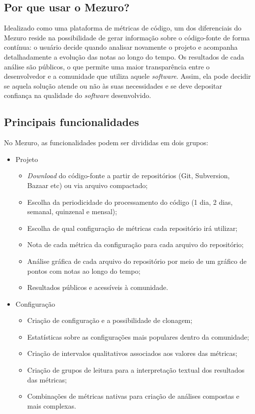 \documentclass{llncs}
\begin{document}
  \subsection{Por que usar o Mezuro?} \label{sec:projeto-mezuro}
  Idealizado como uma plataforma de métricas de código, um dos diferenciais do Mezuro reside na possibilidade de gerar informação sobre o código-fonte de forma contínua: o usuário decide quando analisar novamente o projeto e acompanha detalhadamente a evolução das notas ao longo do tempo. Os resultados de cada análise são públicos, o que permite uma maior transparência entre o desenvolvedor e a comunidade que utiliza aquele \textit{software}. Assim, ela pode decidir se aquela solução atende ou não às suas necessidades e se deve depositar confiança na qualidade do \textit{software} desenvolvido.

  \subsection{Principais funcionalidades}\label{sec:princ-funcionalidades}
  No Mezuro, as funcionalidades podem ser divididas em dois grupos:
  \begin{itemize}
    \item Projeto
      \begin{itemize}
      \item \textit{Download} do código-fonte a partir de repositórios (Git, Subversion, Bazaar etc) ou via arquivo compactado;
          \item Escolha da periodicidade do processamento do código (1 dia, 2 dias, semanal, quinzenal e mensal);
          \item Escolha de qual configuração de métricas cada repositório irá utilizar;
          \item Nota de cada métrica da configuração para cada arquivo do repositório;
          \item Análise gráfica de cada arquivo do repositório por meio de um gráfico de pontos com notas ao longo do tempo;
          \item Resultados públicos e acessíveis à comunidade.
      \end{itemize}
      \item Configuração
      \begin{itemize}
      \item Criação de configuração e a possibilidade de clonagem;
          \item Estatísticas sobre as configurações mais populares dentro da comunidade;
          \item Criação de intervalos qualitativos associados aos valores das métricas;
          \item Criação de grupos de leitura para a interpretação textual dos resultados das métricas;
          \item Combinações de métricas nativas para criação de análises compostas e mais complexas.
      \end{itemize}
  \end{itemize}
\end{document}
